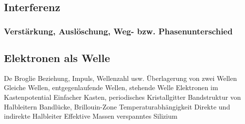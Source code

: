 \subsection{Interferenz}

	\subsubsection{Verstärkung, Auslöschung, Weg- bzw. Phasenunterschied}
\subsection{Elektronen als Welle}
De Broglie Beziehung, Impuls, Wellenzahl usw.
Überlagerung von zwei Wellen
Gleiche Wellen, entgegenlaufende Wellen, stehende Welle
Elektronen im Kastenpotential
Einfacher Kasten, periodisches Kristallgitter
Bandstruktur von Halbleitern
Bandlücke, Brillouin-Zone
Temperaturabhängigkeit
Direkte und indirekte Halbleiter
Effektive Massen
verspanntes Silizium
